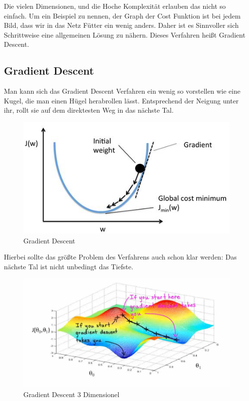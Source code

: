 \documentclass[12pt]{article}
\begin{document}
Die vielen Dimensionen, und die Hoche Komplexität erlauben das nicht so einfach. Um ein Beispiel zu nennen, der Graph der Cost Funktion ist bei jedem Bild, dass wir in das Netz Fütter ein wenig anders. Daher ist es Sinnvoller sich Schrittweise eine allgemeinen Lösung zu nähern. Dieses Verfahren heißt Gradient Descent. \subsection{Gradient Descent}Man kann sich das Gradient Descent Verfahren ein wenig so vorstellen wie eine Kugel, die man einen Hügel herabrollen lässt. Entsprechend der Neigung unter ihr, rollt sie auf dem direktesten Weg in das nächste Tal. 
\begin{figure}[H]
\centering
\includegraphics[scale=0.70]{./Images/Pasted image 20230915145401.png}
\caption{Gradient Descent}
\label{Was kommt hier rein?}
\end{figure}
Hierbei sollte das größte Problem des Verfahrens auch schon klar werden: Das nächste Tal ist nicht unbedingt das Tiefste.
\begin{figure}[H]
\centering
\includegraphics[scale=0.40]{./Images/Pasted image 20230915223421.png}
\caption{Gradient Descent 3 Dimensionel}
\label{Was kommt hier rein?}
\end{figure}
\end{document}
